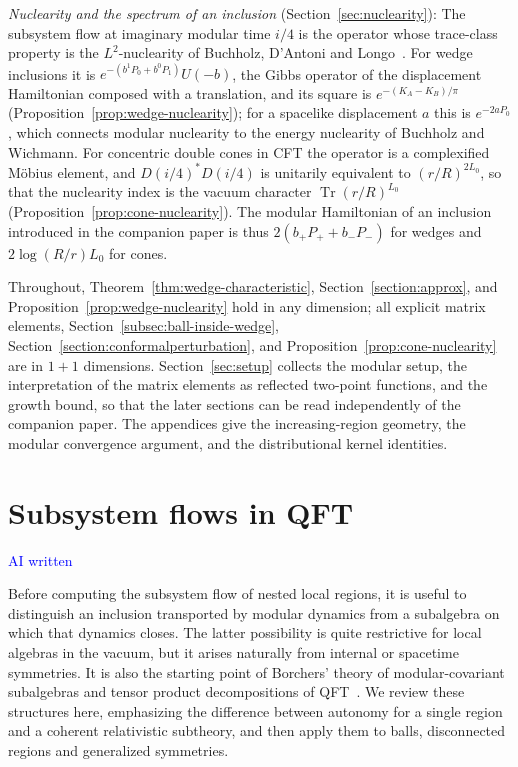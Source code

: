 \documentclass[a4paper,11pt]{article}
\theoremstyle{definition}
\newcommand{\NL}[1]{\textcolor{blue}{#1}}
\begin{document}
\emph{Nuclearity and the spectrum of an inclusion} (Section~\ref{sec:nuclearity}): The subsystem flow at imaginary modular time $i/4$ is the operator whose trace-class property is the $L^2$-nuclearity of Buchholz, D'Antoni and Longo~\cite{BDL2007}. For wedge inclusions it is $e^{-(b^1P_0+b^0P_1)}U(-b)$, the Gibbs operator of the displacement Hamiltonian composed with a translation, and its square is $e^{-(K_A-K_B)/\pi}$ (Proposition~\ref{prop:wedge-nuclearity}); for a spacelike displacement $a$ this is $e^{-2aP_0}$, which connects modular nuclearity to the energy nuclearity of Buchholz and Wichmann. For concentric double cones in CFT the operator is a complexified M\"obius element, and $D(i/4)^*D(i/4)$ is unitarily equivalent to $(r/R)^{2L_0}$, so that the nuclearity index is the vacuum character $\operatorname{Tr}(r/R)^{L_0}$ (Proposition~\ref{prop:cone-nuclearity}). The modular Hamiltonian of an inclusion introduced in the companion paper is thus $2(b_+P_++b_-P_-)$ for wedges and $2\log(R/r)L_0$ for cones.

Throughout, Theorem~\ref{thm:wedge-characteristic}, Section~\ref{section:approx}, and Proposition~\ref{prop:wedge-nuclearity} hold in any dimension; all explicit matrix elements, Section~\ref{subsec:ball-inside-wedge}, Section~\ref{section:conformalperturbation}, and Proposition~\ref{prop:cone-nuclearity} are in $1+1$ dimensions. Section~\ref{sec:setup} collects the modular setup, the interpretation of the matrix elements as reflected two-point functions, and the growth bound, so that the later sections can be read independently of the companion paper. The appendices give the increasing-region geometry, the modular convergence argument, and the distributional kernel identities.


\section{Subsystem flows in QFT}\label{sec:qft-subtheories}

\NL{AI written}

Before computing the subsystem flow of nested local regions, it is
useful to distinguish an inclusion transported by modular dynamics from
a subalgebra on which that dynamics closes. The latter possibility is
quite restrictive for local algebras in the vacuum, but it arises
naturally from internal or spacetime symmetries. It is also the starting
point of Borchers' theory of modular-covariant subalgebras and tensor
product decompositions of QFT~\cite{revolutionizing}. We review these
structures here, emphasizing the difference between autonomy for a
single region and a coherent relativistic subtheory, and then apply
them to balls, disconnected regions and generalized symmetries.
\end{document}

